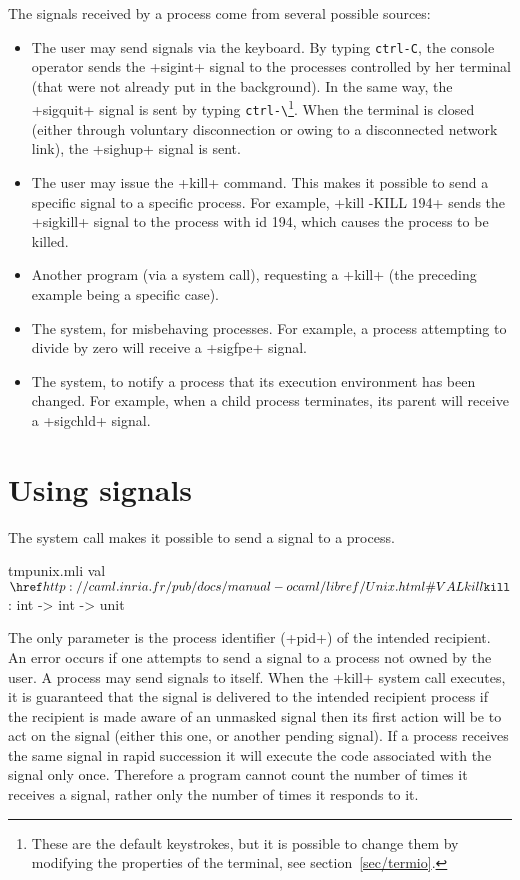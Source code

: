 The signals received by a process come from several possible sources:
%
\begin{itemize}

\item The user may send signals via the keyboard.  By typing \verb'ctrl-C',
  the console operator sends the \ml+sigint+ signal to the processes
  controlled by her terminal (that were not already put in the background).
  In the same way, the \ml+sigquit+ signal is sent by typing \verb'ctrl-\'\footnote{These 
    are the default keystrokes, but it is possible to change them by 
    modifying the properties of the terminal, see section~\ref {sec/termio}.}.  
  When the terminal is closed (either through voluntary disconnection or owing to a disconnected network link), the \ml+sighup+ signal is sent.

\item The user may issue the \ml+kill+ command.  This makes it possible 
  to send a specific signal to a specific process.  For example, 
  \ml+kill -KILL 194+ sends the \ml+sigkill+ signal to the process with id 194, which 
  causes the process to be killed.

\item Another program (via a system call), requesting a
  \ml+kill+ (the preceding example being a specific case).

\item The system, for misbehaving processes.  For example, a process 
  attempting to divide by zero will receive a \ml+sigfpe+ signal.

\item The system, to notify a process that its execution environment has 
  been changed.  For example, when a child process terminates, its parent 
  will receive a \ml+sigchld+ signal.

\end{itemize}


\section{Using signals}

The system call  makes it possible to send a
signal to a process.

%
\begin{listingcodefile}{tmpunix.mli}
val $\libvalue{Unix}{kill}$ : int -> int -> unit
\end{listingcodefile}
%
The only parameter is the process identifier (\ml+pid+) of the
intended recipient.  An error occurs if one attempts to send a signal
to a process not owned by the user.  A process may send signals to
itself.  When the \ml+kill+ system call executes, it is guaranteed
that the signal is delivered to the intended recipient process
\ie{} if the recipient is made aware of an unmasked signal then its
first action will be to act on the signal (either this one, or another
pending signal). If a process receives the same signal in rapid
succession it will execute the code associated with the signal only
once.  Therefore a program cannot count the number of times it
receives a signal, rather only the number of times it responds to it.

